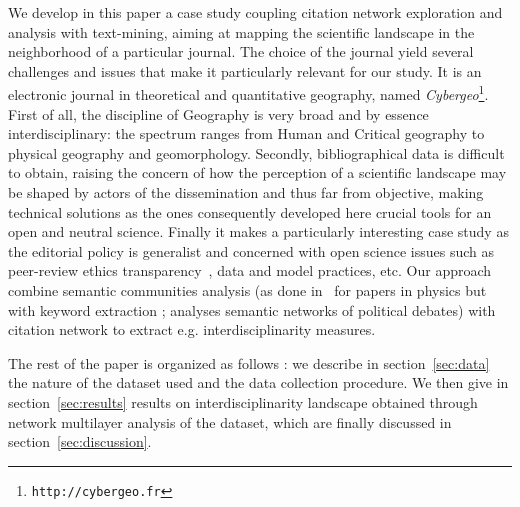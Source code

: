 
We develop in this paper a case study coupling citation network exploration and analysis with text-mining, aiming at mapping the scientific landscape in the neighborhood of a particular journal. The choice of the journal yield several challenges and issues that make it particularly relevant for our study. It is an electronic journal in theoretical and quantitative geography, named \textit{Cybergeo}\footnote{\texttt{http://cybergeo.fr}}. First of all, the discipline of Geography is very broad and by essence interdisciplinary: the spectrum ranges from Human and Critical geography to physical geography and geomorphology. Secondly, bibliographical data is difficult to obtain, raising the concern of how the perception of a scientific landscape may be shaped by actors of the dissemination and thus far from objective, making technical solutions as the ones consequently developed here crucial tools for an open and neutral science. Finally it makes a particularly interesting case study as the editorial policy is generalist and concerned with open science issues such as peer-review ethics transparency~\cite{10.1371/journal.pone.0147913}, data and model practices, etc. Our approach combine semantic communities analysis (as done in~\cite{2016arXiv160208451P} for papers in physics but with keyword extraction ; \cite{2015arXiv151003797G} analyses semantic networks of political debates) with citation network to extract e.g. interdisciplinarity measures.







The rest of the paper is organized as follows : we describe in section~\ref{sec:data} the nature of the dataset used
and the data collection procedure. We then give in section~\ref{sec:results} results on interdisciplinarity landscape obtained through network multilayer analysis of the dataset, which are finally discussed in section~\ref{sec:discussion}.






